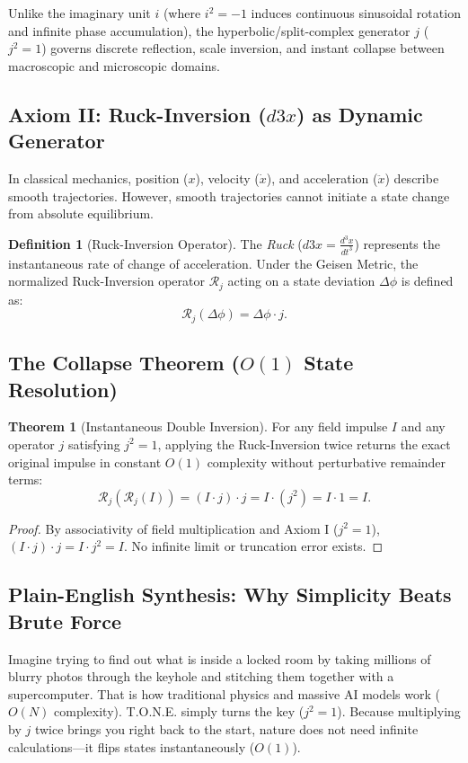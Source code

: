 \documentclass[11pt,a4paper,oneside]{article}
\def\dddot#1{d3#1}%
\theoremstyle{definition}
\newtheorem{definition}{Definition}[section]
\newtheorem{theorem}{Theorem}[section]
\begin{document}
Unlike the imaginary unit $i$ (where $i^2 = -1$ induces continuous sinusoidal rotation and infinite phase accumulation), the hyperbolic/split-complex generator $j$ ($j^2 = 1$) governs discrete reflection, scale inversion, and instant collapse between macroscopic and microscopic domains.

\subsection{Axiom II: Ruck-Inversion ($\dddot{x}$) as Dynamic Generator}
In classical mechanics, position ($x$), velocity ($\dot{x}$), and acceleration ($\ddot{x}$) describe smooth trajectories. However, smooth trajectories cannot initiate a state change from absolute equilibrium.
\begin{definition}[Ruck-Inversion Operator]
The \emph{Ruck} ($\dddot{x} = \frac{d^3x}{dt^3}$) represents the instantaneous rate of change of acceleration. Under the Geisen Metric, the normalized Ruck-Inversion operator $\mathcal{R}_j$ acting on a state deviation $\Delta \phi$ is defined as:
\begin{equation}
\mathcal{R}_j(\Delta \phi) = \Delta \phi \cdot j.
\end{equation}
\end{definition}

\subsection{The Collapse Theorem ($O(1)$ State Resolution)}
\begin{theorem}[Instantaneous Double Inversion]
For any field impulse $I$ and any operator $j$ satisfying $j^2 = 1$, applying the Ruck-Inversion twice returns the exact original impulse in constant $O(1)$ complexity without perturbative remainder terms:
\begin{equation}
\mathcal{R}_j(\mathcal{R}_j(I)) = (I \cdot j) \cdot j = I \cdot (j^2) = I \cdot 1 = I.
\end{equation}
\end{theorem}
\begin{proof}
By associativity of field multiplication and Axiom I ($j^2 = 1$), $(I \cdot j) \cdot j = I \cdot j^2 = I$. No infinite limit or truncation error exists.
\end{proof}

\subsection{Plain-English Synthesis: Why Simplicity Beats Brute Force}
\begin{noobbox}
Imagine trying to find out what is inside a locked room by taking millions of blurry photos through the keyhole and stitching them together with a supercomputer. That is how traditional physics and massive AI models work ($O(N)$ complexity). T.O.N.E. simply turns the key ($j^2 = 1$). Because multiplying by $j$ twice brings you right back to the start, nature does not need infinite calculations—it flips states instantaneously ($O(1)$).
\end{noobbox}
\end{document}
